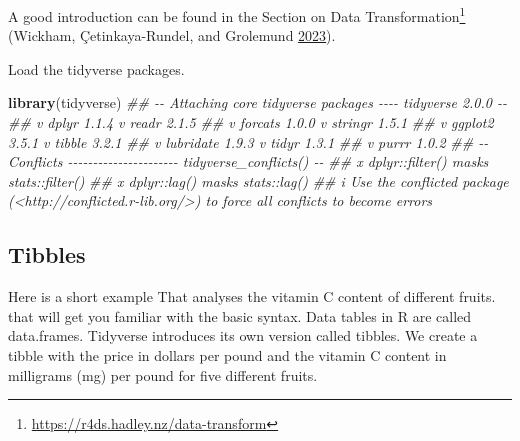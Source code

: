 \documentclass[
  notitlepage]{book}
\newenvironment{Shaded}{\begin{snugshade}}{\end{snugshade}}
\newcommand{\CommentTok}[1]{\textcolor[rgb]{0.56,0.35,0.01}{\textit{#1}}}
\newcommand{\KeywordTok}[1]{\textcolor[rgb]{0.13,0.29,0.53}{\textbf{#1}}}
\newcommand{\NormalTok}[1]{#1}
\DeclareRobustCommand{\href}[2]{#2\footnote{\url{#1}}}
\begin{document}
A good introduction can be found in the \href{https://r4ds.hadley.nz/data-transform}{Section on Data
Transformation} (Wickham, Çetinkaya-Rundel, and Grolemund \protect\hyperlink{ref-Wickham2023}{2023}).

Load the tidyverse packages.

\begin{Shaded}
\begin{Highlighting}[]
\KeywordTok{library}\NormalTok{(tidyverse)}
\CommentTok{\#\# {-}{-} Attaching core tidyverse packages {-}{-}{-}{-} tidyverse 2.0.0 {-}{-}}
\CommentTok{\#\# v dplyr     1.1.4     v readr     2.1.5}
\CommentTok{\#\# v forcats   1.0.0     v stringr   1.5.1}
\CommentTok{\#\# v ggplot2   3.5.1     v tibble    3.2.1}
\CommentTok{\#\# v lubridate 1.9.3     v tidyr     1.3.1}
\CommentTok{\#\# v purrr     1.0.2     }
\CommentTok{\#\# {-}{-} Conflicts {-}{-}{-}{-}{-}{-}{-}{-}{-}{-}{-}{-}{-}{-}{-}{-}{-}{-}{-}{-}{-}{-} tidyverse\_conflicts() {-}{-}}
\CommentTok{\#\# x dplyr::filter() masks stats::filter()}
\CommentTok{\#\# x dplyr::lag()    masks stats::lag()}
\CommentTok{\#\# i Use the conflicted package (\textless{}http://conflicted.r{-}lib.org/\textgreater{}) to force all conflicts to become errors}
\end{Highlighting}
\end{Shaded}

\hypertarget{tibbles}{%
\subsection{Tibbles}\label{tibbles}}

Here is a short example That analyses the vitamin C content of different
fruits. that will get you familiar with the basic syntax. Data tables in
R are called data.frames. Tidyverse introduces its own version called
tibbles. We create a tibble with the price in dollars per pound and the
vitamin C content in milligrams (mg) per pound for five different fruits.
\end{document}
